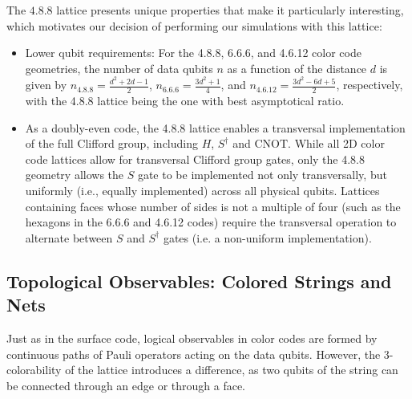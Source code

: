 The $4.8.8$ lattice presents unique properties that make it particularly interesting, which motivates our decision of performing our simulations with this lattice:
\begin{itemize}
    \item Lower qubit requirements: For the 4.8.8, 6.6.6, and 4.6.12 color code geometries, the number of data qubits $n$ as a function of the distance $d$ is given by $n_{4.8.8} = \frac{d^2 + 2d - 1}{2}$, $n_{6.6.6} = \frac{3d^2 + 1}{4}$, and $n_{4.6.12} = \frac{3d^2 - 6d + 5}{2}$, respectively, with the 4.8.8 lattice being the one with best asymptotical ratio. 
    \item {} As a doubly-even code, the 4.8.8 lattice enables a transversal implementation of the full Clifford group, including $H$, $S^\dagger$ and $\text{CNOT}$. While all 2D color code lattices allow for transversal Clifford group gates, only the 4.8.8 geometry allows the $S$ gate to be implemented not only transversally, but uniformly (i.e., equally implemented) across all physical qubits. Lattices containing faces whose number of sides is not a multiple of four (such as the hexagons in the 6.6.6 and 4.6.12 codes) require the transversal operation to alternate between $S$ and $S^\dagger$ gates (i.e. a non-uniform implementation).
\end{itemize}

\subsection{Topological Observables: Colored Strings and Nets}
Just as in the surface code, logical observables in color codes are formed by continuous paths of Pauli operators acting on the data qubits. However, the 3-colorability of the lattice introduces a difference, as two qubits of the string can be connected through an edge or through a face.


